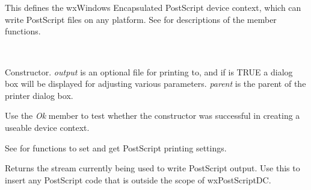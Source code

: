 \section{}\label{wxpostscriptdc}

This defines the wxWindows Encapsulated PostScript device context,
which can write PostScript files on any platform. See  for
descriptions of the member functions.


\\



Constructor. {\it output} is an optional file for printing to, and if
 is TRUE a dialog box will be displayed for adjusting
various parameters. {\it parent} is the parent of the printer dialog box.

Use the {\it Ok} member to test whether the constructor was successful
in creating a useable device context.

See  for functions to set and
get PostScript printing settings.



Returns the stream currently being used to write PostScript output. Use this
to insert any PostScript code that is outside the scope of wxPostScriptDC.


